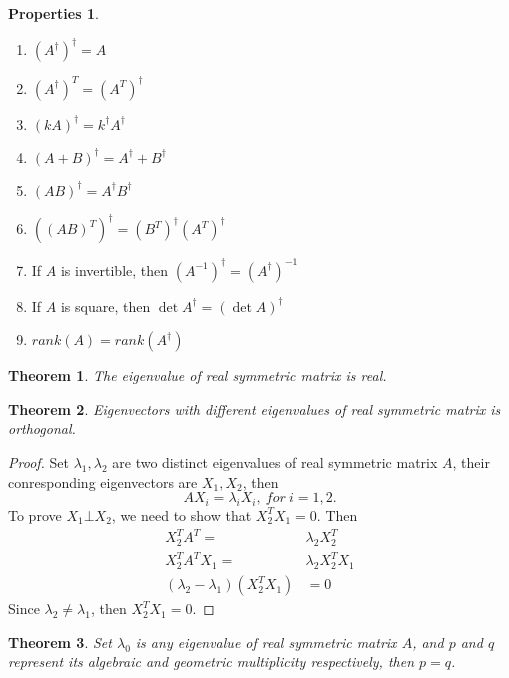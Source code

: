 \documentclass{article}
\newtheorem{theorem}{Theorem}[section]
\theoremstyle{definition}
\newtheorem{pro}{Properties}[section]
\begin{document}
\begin{pro}
    \begin{enumerate}
        \item $(A^{\dagger})^{\dagger}=A$
        \item $(A^{\dagger})^{T}=(A^{T})^{\dagger}$
        \item $(kA)^{\dagger}=k^{\dagger}A^{\dagger}$
        \item $(A+B)^{\dagger}=A^{\dagger}+B^{\dagger}$
        \item $(AB)^{\dagger}=A^{\dagger}B^{\dagger}$
        \item $((AB)^{T})^{\dagger}=(B^{T})^{\dagger}(A^{T})^{\dagger}$
        \item If $A$ is invertible, then $(A^{-1})^{\dagger}=(A^{\dagger})^{-1}$
        \item If $A$ is square, then $\det A^{\dagger}=(\det A)^{\dagger}$
        \item $rank(A) = rank (A^{\dagger})$
    \end{enumerate}
\end{pro}

\begin{theorem}
    The eigenvalue of real symmetric matrix is real. 
\end{theorem}

\begin{theorem}
    Eigenvectors with different eigenvalues of real symmetric matrix is orthogonal.
\end{theorem}

\begin{proof}
Set $\lambda_{1},\lambda_{2}$ are two distinct eigenvalues of real symmetric matrix $A$, their conresponding eigenvectors are 
$X_{1},X_{2}$, then 
$$AX_{i}=\lambda_{i}X_{i},\ for\ i=1,2.$$
To prove $X_{1}\bot X_{2}$, we need to show that $X_{2}^{T}X_{1}=0$. Then 
\begin{align*}
    X_{2}^{T}A^{T}=&\lambda_{2}X_{2}^{T}\\
    X_{2}^{T}A^{T}X_{1}=&\lambda_{2}X_{2}^{T}X_{1}\\
    (\lambda_{2}-\lambda_{1})(X_{2}^{T}X_{1})&=0
\end{align*}
Since $\lambda_{2}\neq\lambda_{1}$, then $X_{2}^{T}X_{1}=0$.
\end{proof}

\begin{theorem}
Set $\lambda_{0}$ is any eigenvalue of real symmetric matrix $A$, and $p$ and $q$ represent its algebraic and geometric multiplicity respectively, then
$p=q$.
\end{theorem}
\end{document}
